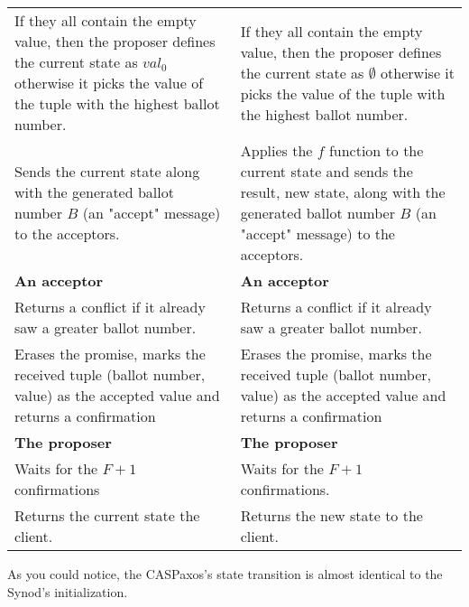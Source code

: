 \documentclass[12pt]{article}
\theoremstyle{definition}
\begin{document}
\begin{center}
\begin{longtable}{p{15em}|p{15em}}
  
  If they all contain the empty value, then the proposer defines the current state as $val_0$ otherwise it picks the value of the tuple with the highest ballot number.
  &
  If they all contain the empty value, then the proposer defines the current state as $\emptyset$ otherwise it picks the value of the tuple with the highest ballot number.
  \\[6pt]
  
  
  Sends the current state along with the generated ballot number $B$ (an "accept" message) to the acceptors.
  &
  Applies the $f$ function to the current state and sends the result, new state, along with the generated ballot number $B$ (an "accept" message) to the acceptors.
  \\[6pt]
  
  \hline
  
  {\bf An acceptor}
  &
  {\bf An acceptor} \\[6pt]
  
  
  Returns a conflict if it already saw a greater ballot number.
  &
  Returns a conflict if it already saw a greater ballot number.
  \\[6pt]
  
  
  Erases the promise, marks the received tuple (ballot number, value) as the accepted value and returns a confirmation
  &
  Erases the promise, marks the received tuple (ballot number, value) as the accepted value and returns a confirmation
  \\[6pt]
  
  \hline

  {\bf The proposer}
  &
  {\bf The proposer} \\[6pt]

  
  Waits for the $F+1$ confirmations
  &
  Waits for the $F+1$ confirmations. \\[6pt]
  
  
  Returns the current state the client.
  &
  Returns the new state to the client. \\[6pt]
  
  \hline
\end{longtable}
\end{center}

As you could notice, the CASPaxos's state transition is almost identical to the Synod's initialization. 
\end{document}
